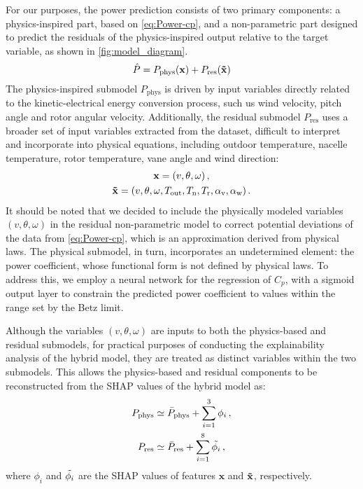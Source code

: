 \documentclass[preprint,12pt]{elsarticle}
\begin{document}
For our purposes, the power prediction consists of two primary components: a physics-inspired part, based on \autoref{eq:Power-cp}, and a non-parametric part designed to predict the residuals of the physics-inspired output relative to the target variable, as shown in \autoref{fig:model_diagram}.
\begin{equation}\label{eq:hybrid_model}
     \hat{P} = P_{\text{phys}}(\mathbf{x}) + P_{\text{res}}(\mathbf{\Tilde{x}})
 \end{equation}
 The physics-inspired submodel $P_\text{phys}$ is driven by input variables directly related to the kinetic-electrical energy conversion process, such us wind velocity, pitch angle and rotor angular velocity. Additionally, the residual submodel $P_\text{res}$ uses a broader set of input variables extracted from the dataset, difficult to interpret and incorporate into physical equations, including outdoor temperature, nacelle temperature, rotor temperature, vane angle and wind direction:
\begin{gather}
    \mathbf{x} = (v,\theta,\omega) \,, \\
    \mathbf{\Tilde{x}} = (v,\theta,\omega,T_{\text{out}},
T_{\text{n}},T_{\text{r}},\alpha_\text{v},\alpha_\text{w}) \,.
\end{gather}
It should be noted that we decided to include the physically modeled variables $(v, \theta, \omega)$ in the residual non-parametric model to correct potential deviations of the data from \autoref{eq:Power-cp}, which is an approximation derived from physical laws. The physical submodel, in turn, incorporates an undetermined element: the power coefficient, whose functional form is not defined by physical laws. To address this, we employ a neural network for the regression of $C_p$, with a sigmoid output layer to constrain the predicted power coefficient to values within the range set by the Betz limit.

Although the variables $(v, \theta, \omega)$ are inputs to both the physics-based and residual submodels, for practical purposes of conducting the explainability analysis of the hybrid model, they are treated as distinct variables within the two submodels. This allows the physics-based and residual components to be reconstructed from the SHAP values of the hybrid model as:   
\begin{align}
    P_{\text{phys}} &\simeq \bar{P}_{\text{phys}} + \sum_{i=1}^3 \phi_i \,, \\
    P_{\text{res}} &\simeq \bar{P}_{\text{res}} + \sum_{i=1}^8 \Tilde{\phi_i} \,,
\end{align}
where $\phi_i$ and $\Tilde{\phi_i}$ are the SHAP values of features $\mathbf{x}$ and $\mathbf{\Tilde{x}}$, respectively.
\end{document}
